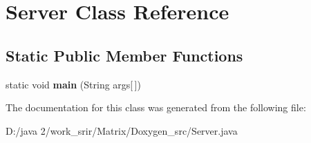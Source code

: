 \hypertarget{class_server}{}\section{Server Class Reference}
\label{class_server}
\subsection*{Static Public Member Functions}
\begin{DoxyCompactItemize}
\item 
\hypertarget{class_server_ad90c92078da8d9c8a084e7cbc6cff4af}{}static void {\bfseries main} (String args\mbox{[}$\,$\mbox{]})\label{class_server_ad90c92078da8d9c8a084e7cbc6cff4af}

\end{DoxyCompactItemize}


The documentation for this class was generated from the following file\+:\begin{DoxyCompactItemize}
\item 
D\+:/java 2/work\+\_\+srir/\+Matrix/\+Doxygen\+\_\+src/Server.\+java\end{DoxyCompactItemize}
